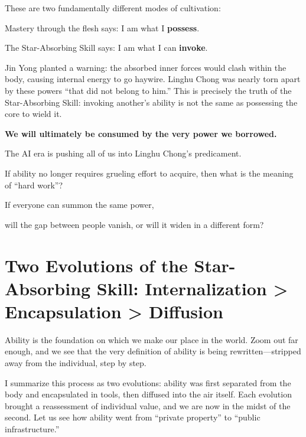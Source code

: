 \vspace{1em}

These are two fundamentally different modes of cultivation:

Mastery through the flesh says: I am what I \textbf{possess}.

The Star-Absorbing Skill says: I am what I can \textbf{invoke}.

\vspace{1em}

Jin Yong planted a warning: the absorbed inner forces would clash within the body, causing internal energy to go haywire. Linghu Chong was nearly torn apart by these powers ``that did not belong to him.'' This is precisely the truth of the Star-Absorbing Skill: invoking another's ability is not the same as possessing the core to wield it.

\vspace{1em}

\textbf{We will ultimately be consumed by the very power we borrowed.}

The AI era is pushing all of us into Linghu Chong's predicament.


\begin{thinkbox}[Reflection]
If ability no longer requires grueling effort to acquire, then what is the meaning of ``hard work''?

If everyone can summon the same power,

will the gap between people vanish, or will it widen in a different form?
\end{thinkbox}


\newpage
\section{Two Evolutions of the Star-Absorbing Skill: Internalization > Encapsulation > Diffusion}

Ability is the foundation on which we make our place in the world. Zoom out far enough, and we see that the very definition of ability is being rewritten---stripped away from the individual, step by step.

I summarize this process as two evolutions: ability was first separated from the body and encapsulated in tools, then diffused into the air itself. Each evolution brought a reassessment of individual value, and we are now in the midst of the second.
Let us see how ability went from ``private property'' to ``public infrastructure.''

